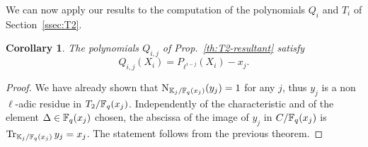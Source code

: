 \documentclass{sig-alternate}
\newtheorem{corollary}[definition]{Corollary}
\begin{document}
We can now apply our results to the computation of the polynomials
$Q_i$ and $T_i$ of Section~\ref{ssec:T2}.

\begin{corollary}
  The polynomials $Q_{i,j}$ of Prop.~\ref{th:T2-resultant}
  satisfy
  \begin{equation*}
    Q_{i,j}(X_i) = P_{\ell^{i-j}}(X_i) - x_j.
  \end{equation*}
\end{corollary}
\begin{proof}
  We have already shown that $\operatorname{N}_{\mathbb{K}_j/\mathbb{F}_q(x_j)}(y_j)=1$ for any
  $j$, thus $y_j$ is a non $\ell$-adic residue in
  $T_2/\mathbb{F}_q(x_j)$. Independently of the characteristic and of the
  element $\Delta\in\mathbb{F}_q(x_j)$ chosen, the abscissa of the image of
  $y_j$ in $C/\mathbb{F}_q(x_j)$ is $\operatorname{Tr}_{\mathbb{K}_j/\mathbb{F}_q(x_j)}y_j=x_j$. The
  statement follows from the previous theorem.
\end{proof}
\end{document}
